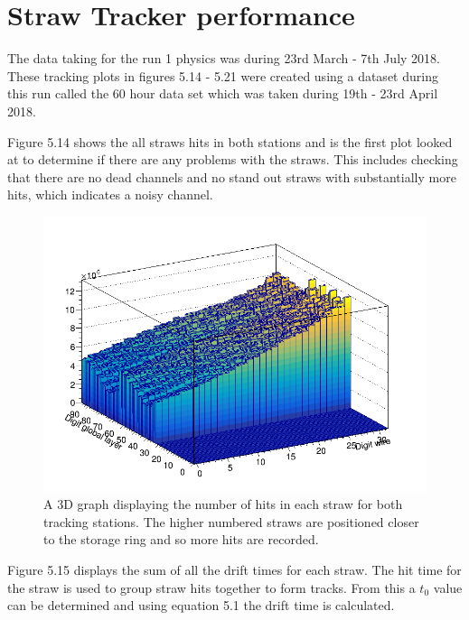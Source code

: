 \section{Straw Tracker performance}

The data taking for the run 1 physics was during 23rd March - 7th July 2018. These tracking plots in figures 5.14 - 5.21 were created using a dataset during this run called the 60 hour data set which was taken during 19th - 23rd April 2018. 

Figure 5.14 shows the all straws hits in both stations and is the first plot looked at to determine if there are any problems with the straws. This includes checking that there are no dead channels and no stand out straws with substantially more hits, which indicates a noisy channel.

\begin{figure}[th]
\centering
\includegraphics[scale=0.5]{Figures/DigitChannelMap_.png}
\decoRule
\caption{A 3D graph displaying the number of hits in each straw for both tracking stations. The higher numbered straws are positioned closer to the storage ring and so more hits are recorded.}
\label{fig:DigitChannelMap_}
\end{figure}

Figure 5.15 displays the sum of all the drift times for each straw. The hit time for the straw is used to group straw hits together to form tracks. From this a $t_0$ value can be determined and using equation 5.1 the drift time is calculated.

